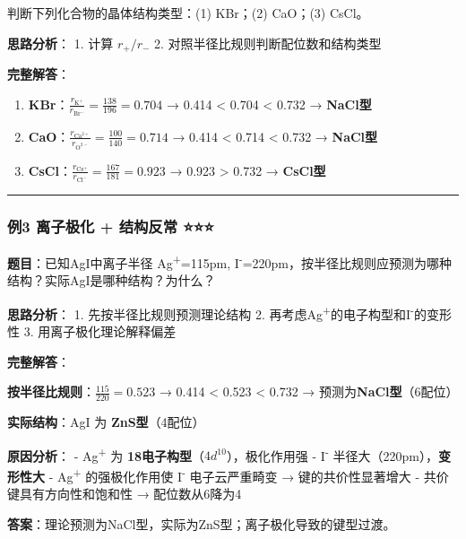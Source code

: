 判断下列化合物的晶体结构类型：(1) KBr；(2) CaO；(3) CsCl。

\textbf{思路分析}：
1. 计算 \(r_+/r_-\)
2. 对照半径比规则判断配位数和结构类型

\textbf{完整解答}：

\begin{enumerate}
\def\labelenumi{(\arabic{enumi})}
\item
  \textbf{KBr}：\(\frac{r_{\mathrm{K^+}}}{r_{\mathrm{Br^-}}} = \frac{138}{196} = 0.704\) → 0.414 \textless{} 0.704 \textless{} 0.732 → \textbf{NaCl型}
\item
  \textbf{CaO}：\(\frac{r_{\mathrm{Ca^{2+}}}}{r_{\mathrm{O^{2-}}}} = \frac{100}{140} = 0.714\) → 0.414 \textless{} 0.714 \textless{} 0.732 → \textbf{NaCl型}
\item
  \textbf{CsCl}：\(\frac{r_{\mathrm{Cs^+}}}{r_{\mathrm{Cl^-}}} = \frac{167}{181} = 0.923\) → 0.923 \textgreater{} 0.732 → \textbf{CsCl型}
\end{enumerate}

\begin{center}\rule{0.5\linewidth}{0.5pt}\end{center}

\subsubsection{例3 离子极化 + 结构反常 ⭐⭐⭐}\label{ux4f8b3-ux79bbux5b50ux6781ux5316-ux7ed3ux6784ux53cdux5e38}

\textbf{题目}：已知AgI中离子半径 Ag\textsuperscript{+}=115pm, I\textsuperscript{-}=220pm，按半径比规则应预测为哪种结构？实际AgI是哪种结构？为什么？

\textbf{思路分析}：
1. 先按半径比规则预测理论结构
2. 再考虑Ag\textsuperscript{+}的电子构型和I\textsuperscript{-}的变形性
3. 用离子极化理论解释偏差

\textbf{完整解答}：

\textbf{按半径比规则}：\(\frac{115}{220} = 0.523\) → 0.414 \textless{} 0.523 \textless{} 0.732 → 预测为\textbf{NaCl型}（6配位）

\textbf{实际结构}：AgI 为 \textbf{ZnS型}（4配位）

\textbf{原因分析}：
- Ag\textsuperscript{+} 为 \textbf{18电子构型}（\(4d^{10}\)），极化作用强
- I\textsuperscript{-} 半径大（220pm），\textbf{变形性大}
- Ag\textsuperscript{+} 的强极化作用使 I\textsuperscript{-} 电子云严重畸变 → 键的共价性显著增大
- 共价键具有方向性和饱和性 → 配位数从6降为4

\textbf{答案}：理论预测为NaCl型，实际为ZnS型；离子极化导致的键型过渡。

